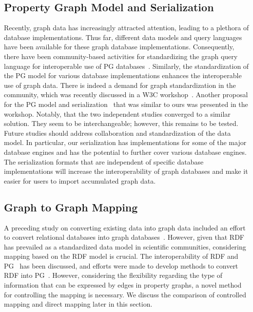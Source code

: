 \documentclass[runningheads]{llncs}
\begin{document}
\subsection{Property Graph Model and Serialization}
Recently, graph data has increasingly attracted attention, leading to a plethora of database implementations. 
Thus far, different data models and query languages have been available for these graph database implementations.
Consequently, there have been community-based activities for standardizing the graph query language for interoperable use of PG databases~\cite{angles3}. Similarly, the standardization of the PG model for various database implementations enhances the interoperable use of graph data. There is indeed a demand for graph standardization in the community, which was recently discussed in a W3C workshop~\cite{w3c}. Another proposal for the PG model and serialization~\cite{tomaszuk} that was similar to ours was presented in the workshop. Notably, that the two independent studies converged to a similar solution. They seem to be interchangeable; however, this remains to be tested. Future studies should address collaboration and standardization of the data model.
In particular, our serialization has implementations for some of the major database engines and has the potential to further cover various database engines. 
The serialization formats that are independent of specific database implementations will increase the interoperability of graph databases and make it easier for users to import accumulated graph data.

\subsection{Graph to Graph Mapping}
A preceding study on converting existing data into graph data included an effort to convert relational databases into graph databases~\cite{virgilio1}. 
However, given that RDF has prevailed as a standardized data model in scientific communities, considering mapping based on the RDF model is crucial. The interoperability of RDF and PG~\cite{hartig,angles4,das,thakkar} has been discussed, and efforts were made to develop methods to convert RDF into PG~\cite{tomaszuk1,virgilio}. However, considering the flexibility regarding the type of information that can be expressed by edges in property graphs, a novel method for controlling the mapping is necessary.
We discuss the comparison of controlled mapping and direct mapping later in this section.
\end{document}
